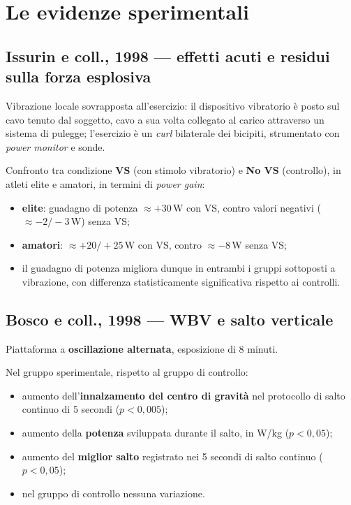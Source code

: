 \section{Le evidenze sperimentali}

\subsection{Issurin e coll., 1998 --- effetti acuti e residui sulla forza esplosiva}

Vibrazione locale sovrapposta all'esercizio: il dispositivo vibratorio è posto sul cavo tenuto dal
soggetto, cavo a sua volta collegato al carico attraverso un sistema di pulegge; l'esercizio è un
\textit{curl} bilaterale dei bicipiti, strumentato con \textit{power monitor} e sonde.

Confronto tra condizione \textbf{VS} (con stimolo vibratorio) e \textbf{No VS} (controllo), in
atleti elite e amatori, in termini di \textit{power gain}:
\begin{itemize}
  \item \textbf{elite}: guadagno di potenza $\approx +30$\,W con VS, contro valori negativi
    ($\approx -2/-3$\,W) senza VS;
  \item \textbf{amatori}: $\approx +20/+25$\,W con VS, contro $\approx -8$\,W senza VS;
  \item il guadagno di potenza migliora dunque in entrambi i gruppi sottoposti a vibrazione, con
    differenza statisticamente significativa rispetto ai controlli.
\end{itemize}

\subsection{Bosco e coll., 1998 --- WBV e salto verticale}

Piattaforma a \textbf{oscillazione alternata}, esposizione di 8 minuti.

Nel gruppo sperimentale, rispetto al gruppo di controllo:
\begin{itemize}
  \item aumento dell'\textbf{innalzamento del centro di gravità} nel protocollo di salto continuo di
    5 secondi ($p<0{,}005$);
  \item aumento della \textbf{potenza} sviluppata durante il salto, in W/kg ($p<0{,}05$);
  \item aumento del \textbf{miglior salto} registrato nei 5 secondi di salto continuo ($p<0{,}05$);
  \item nel gruppo di controllo nessuna variazione.
\end{itemize}

